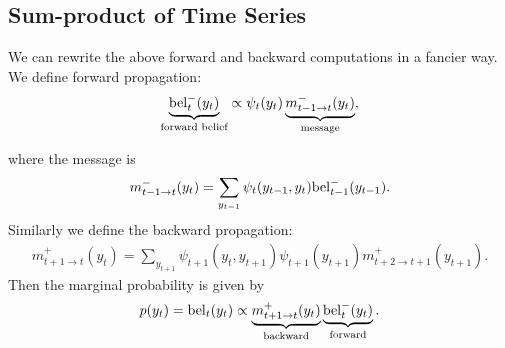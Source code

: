 \documentclass{article}
\begin{document}
\subsection{Sum-product of Time Series}
We can rewrite the above forward and backward computations in a fancier way. We define forward propagation:
\begin{align*}
\underbrace{{\rm bel}_t^-(y_t)}_{\text{forward belief}}
\propto \psi_t(y_t)
\underbrace{m_{t-1\rightarrow t}^-(y_t)}_{\text{message}},
\end{align*}

where the message is 
\begin{align*}
m_{t-1\rightarrow t}^-(y_t)=\sum_{y_{t-1}}\psi_t(y_{t-1},y_t){\rm bel}_{t-1}^-(y_{t-1}).
\end{align*}
Similarly we define the backward propagation:
\begin{align*}
m_{t+1\rightarrow t}^+(y_t)=\sum_{y_{t+1}}\psi_{t+1}(y_t,y_{t+1})\psi_{t+1}(y_{t+1})m_{t+2\rightarrow t+1}^+(y_{t+1}).
\end{align*}
Then the marginal probability is given by 
\begin{align*}
p(y_t)={\rm bel}_t(y_t)\propto \underbrace{m_{t+1\rightarrow t}^+(y_t)}_{\text{backward}}\underbrace{{\rm bel}_t^{-}(y_t)}_{\text{forward}}.
\end{align*}
\end{document}
